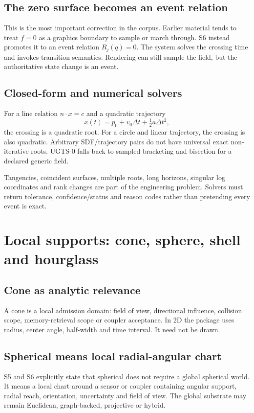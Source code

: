 \documentclass[10.5pt,a4paper,openany]{book}
\newcommand{\statusretain}{\tcbox[on line,boxsep=1pt,left=3pt,right=3pt,top=1pt,bottom=1pt,arc=2pt,colback=UGTSTeal,colframe=UGTSTeal,coltext=white,fontupper=\sffamily\bfseries\scriptsize]{RETAIN}}
\newcommand{\statusreject}{\tcbox[on line,boxsep=1pt,left=3pt,right=3pt,top=1pt,bottom=1pt,arc=2pt,colback=UGTSCoral,colframe=UGTSCoral,coltext=white,fontupper=\sffamily\bfseries\scriptsize]{REJECT}}
\begin{document}
\section{The zero surface becomes an event relation}
This is the most important correction in the corpus. Earlier material tends to treat $f=0$ as a graphics boundary to sample or march through. S6 instead promotes it to an event relation $R_j(q)=0$. The system solves the crossing time and invokes transition semantics. Rendering can still sample the field, but the authoritative state change is an event.

\section{Closed-form and numerical solvers}
\statusretain\quad For a line relation $n\cdot x=c$ and a quadratic trajectory
\[
x(t)=p_0+v_0\Delta t+\tfrac12a\Delta t^2,
\]
the crossing is a quadratic root. For a circle and linear trajectory, the crossing is also quadratic. \statusreject\quad Arbitrary SDF/trajectory pairs do not have universal exact non-iterative roots. UGTS-0 falls back to sampled bracketing and bisection for a declared generic field.

\begin{riskbox}
Tangencies, coincident surfaces, multiple roots, long horizons, singular log coordinates and rank changes are part of the engineering problem. Solvers must return tolerance, confidence/status and reason codes rather than pretending every event is exact.
\end{riskbox}

\chapter{Local supports: cone, sphere, shell and hourglass}
\section{Cone as analytic relevance}
\statusretain\quad A cone is a local admission domain: field of view, directional influence, collision scope, memory-retrieval scope or coupler acceptance. In 2D the package uses radius, center angle, half-width and time interval. It need not be drawn.

\section{Spherical means local radial-angular chart}
S5 and S6 explicitly state that spherical does not require a global spherical world. It means a local chart around a sensor or coupler containing angular support, radial reach, orientation, uncertainty and field of view. The global substrate may remain Euclidean, graph-backed, projective or hybrid.
\end{document}
